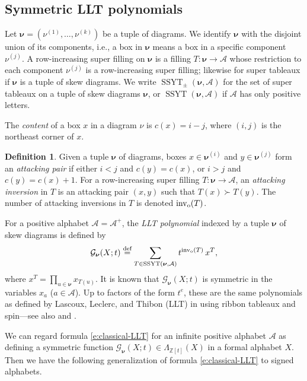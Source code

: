 \documentclass[12pt]{amsart}
\theoremstyle{definition}
\newtheorem{defn}[thm]{Definition}
\theoremstyle{remark}
\newcommand{\ZZ}{{\mathbb Z}}
\newcommand{\nubold}{{\boldsymbol \nu }}
\newcommand{\Acal}{{\mathcal A}}
\newcommand{\Gcal}{{\mathcal G}}
\newcommand{\sgngt}{\succ}
\DeclareMathOperator{\inv}{inv}
\newcommand{\oinv}{\inv _{{\rm o}}}
\DeclareMathOperator{\SSYT}{SSYT}
\newcommand{\defeq}{\mathrel{\overset{\text{{\rm def}}}{=}}}
\begin{document}
\subsection{Symmetric LLT polynomials}
\label{ss:classical-LLT}

Let $\nubold = (\nu ^{(1)},\ldots,\nu ^{(k)})$ be a tuple of diagrams.
We identify $\nubold $ with the disjoint union of its components,
i.e., a box in $\nubold $ means a box in a specific component $\nu
^{(j)}$.  A row-increasing super filling on $\nubold$ is a filling
$T\colon \nubold \rightarrow \Acal $ whose restriction to each
component $\nu ^{(j)}$ is a row-increasing super filling; likewise for
super tableaux if $\nubold$ is a tuple of skew diagrams.  We write
$\SSYT _{\pm }(\nubold ,\Acal )$ for the set of super tableaux on a
tuple of skew diagrams $\nubold $, or $\SSYT(\nubold,\Acal)$ if
$\mathcal A$ has only positive letters.


The {\em content} of a box $x$ in a diagram $\nu$ is $c(x)=i-j$, where
$(i,j)$ is the northeast corner of $x$.

\begin{defn} \label{def:inv_old}
Given a tuple $\nubold$ of diagrams, boxes $x\in \nubold ^{(i)}$ and
$y\in \nubold ^{(j)}$ form an {\em attacking pair} if either $i<j$ and
$c(y) = c(x)$, or $i>j$ and $c(y)=c(x)+1$.  For a row-increasing super
filling $T:\nubold\to \mathcal A$, an {\em attacking inversion} in $T$
is an attacking pair $(x,y)$ such that $T(x) \sgngt T(y)$.  The number
of attacking inversions in $T$ is denoted $\oinv (T)$.
\end{defn}

For a positive alphabet $\Acal = \Acal ^{+}$, the {\em LLT polynomial}
indexed by a tuple $\nubold$ of skew diagrams is defined by
\begin{equation}\label{e:classical-LLT}
\Gcal _{\nubold }(X;t) \defeq \sum _{T\in \SSYT (\nubold ,\Acal )}
t^{\oinv (T)}\, x^{T},
\end{equation}
where $x^{T} = \prod _{u\in \nubold } x_{T(u)}$.  It is known that
$\Gcal _\nubold (X;t)$ is symmetric in the variables $x_{a}$ ($a\in
\Acal $).  Up to factors of the form $t^{e}$, these are the same
polynomials as defined by Lascoux, Leclerc, and Thibon (LLT) in
\cite{LasLecTh97} using ribbon tableaux and spin---see also \cite[\S
5]{HaHaLoRU05} and \cite[\S 10]{HagHaiLo05}.

We can regard formula \eqref{e:classical-LLT} for an infinite positive
alphabet $\Acal $ as defining a symmetric function $\Gcal _{\nubold
}(X;t)\in \Lambda _{\ZZ [t]}(X)$ in a formal alphabet $X$.  Then we
have the following generalization of formula \eqref{e:classical-LLT}
to signed alphabets.
\end{document}

